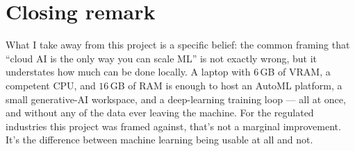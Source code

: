 \documentclass[12pt, a4paper]{report}
\begin{document}
\section*{Closing remark}

What I take away from this project is a specific belief: the
common framing that ``cloud AI is the only way you can scale ML''
is not exactly wrong, but it understates how much can be done
locally. A laptop with $6$\,GB of VRAM, a competent CPU, and
$16$\,GB of RAM is enough to host an AutoML platform, a small
generative-AI workspace, and a deep-learning training loop --- all
at once, and without any of the data ever leaving the machine. For
the regulated industries this project was framed against, that's
not a marginal improvement. It's the difference between machine
learning being usable at all and not.
\end{document}
